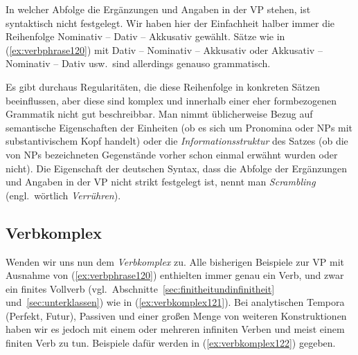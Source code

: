 In welcher Abfolge die Ergänzungen und Angaben in der VP stehen, ist syntaktisch nicht festgelegt.
Wir haben hier der Einfachheit halber immer die Reihenfolge Nominativ -- Dativ -- Akkusativ gewählt.
Sätze wie in (\ref{ex:verbphrase120}) mit Dativ -- Nominativ -- Akkusativ oder Akkusativ -- Nominativ -- Dativ usw.\ sind allerdings genauso grammatisch.

\begin{exe}
  \ex\label{ex:verbphrase120}
  \begin{xlist}
    \ex{\ThePhrasenExOne}
    \ex{\ThePhrasenExTwo}
  \end{xlist}
\end{exe}

Es gibt durchaus Regularitäten, die diese Reihenfolge in konkreten Sätzen beeinflussen, aber diese sind komplex und innerhalb einer eher formbezogenen Grammatik nicht gut beschreibbar.
Man nimmt üblicherweise Bezug auf semantische Eigenschaften der Einheiten (\zB ob es sich um Pronomina oder NPs mit substantivischem Kopf handelt) oder die \textit{Informationsstruktur} des Satzes (\zB ob die von NPs bezeichneten Gegenstände vorher schon einmal erwähnt wurden oder nicht).
Die Eigenschaft der deutschen Syntax, dass die Abfolge der Ergänzungen und Angaben in der VP nicht strikt festgelegt ist, nennt man \textit{Scrambling} (engl.\ wörtlich \textit{Verrühren}).



\subsection{Verbkomplex}
\label{sec:verbkomplex}


Wenden wir uns nun dem \textit{Verbkomplex} zu.
Alle bisherigen Beispiele zur VP mit Ausnahme von (\ref{ex:verbphrase120}) enthielten immer genau ein Verb, und zwar ein finites Vollverb (vgl.\ Abschnitte~\ref{sec:finitheitundinfinitheit} und~\ref{sec:unterklassen}) wie in (\ref{ex:verbkomplex121}).
Bei analytischen Tempora (Perfekt, Futur), Passiven und einer großen Menge von weiteren Konstruktionen haben wir es jedoch mit einem oder mehreren infiniten Verben und meist einem finiten Verb zu tun.
Beispiele dafür werden in (\ref{ex:verbkomplex122}) gegeben.


